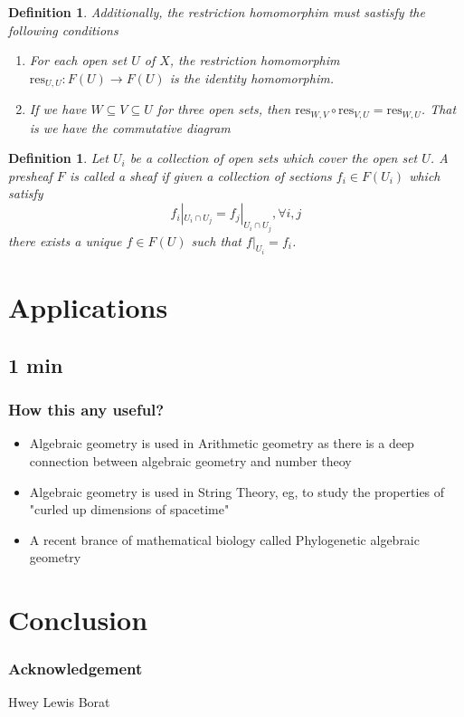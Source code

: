 \documentclass[pdf]{beamer}
\newtheorem{defn}[theorem]{Definition}
\begin{document}
\begin{frame}
    \begin{defn}
Additionally, the restriction homomorphim must sastisfy the following conditions
\begin{enumerate}
    \item For each open set $U$ of $X$, the restriction homomorphim $\text{res}_{U,U}: F(U) \rightarrow F(U)$ is the identity homomorphim.
    \item If we have $W \subseteq V \subseteq U$ for three open sets, then $\text{res}_{W,V} \circ \text{res}_{V,U} = \text{res}_{W,U}$. That is we have the commutative diagram

\end{enumerate}
\end{defn}

\end{frame}

\begin{frame}
\begin{defn}
    Let  $U_i$ be a collection of open sets which cover the open set $U$. A presheaf $F$ is called a sheaf if given a collection of sections $f_i \in F(U_i)$ which satisfy  
    $$f_i |_{U_i \cap U_j} = f_j |_{U_i \cap U_j}, \forall i,j$$
   there exists a unique $f \in F(U)$ such that $f|_{U_i} = f_i$.
\end{defn}
 \end{frame}

 \section{Applications}
 \subsection{1 min}

 \begin{frame}
     \frametitle{How this any useful?}
     \begin{itemize}
         \item Algebraic geometry is used in Arithmetic geometry as there is a deep connection between algebraic geometry and number theoy
         \item Algebraic geometry is used in String Theory, eg, to study the properties of "curled up dimensions of spacetime"
         \item A recent brance of mathematical biology called Phylogenetic algebraic geometry
     \end{itemize}
\end{frame}

\section{Conclusion}

\begin{frame}
    \frametitle{Acknowledgement}
    Hwey Lewis
    Borat
\end{frame}
     
\end{document}
